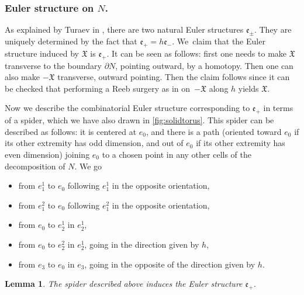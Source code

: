 \documentclass[10pt]{amsart}
\theoremstyle{plain}
\newtheorem{lem}[thm]{Lemma}
\theoremstyle{definition}
\theoremstyle{remark}
\numberwithin{equation}{section}
\begin{document}
\subsubsection*{Euler structure on $N$.}
As explained by Turaev in \cite[\S VI.2.4]{Turaev_tors}, there are two natural Euler structures $\mathfrak e_{\pm}$. They are uniquely determined by the fact that $\mathfrak e_+ = h \mathfrak e_-$. We~claim that the Euler structure induced by $\mathfrak X$ is $\mathfrak e_+$. It can be seen as follows: first one needs to make $\mathfrak X$ transverse to the boundary $\partial N$, pointing outward, by a homotopy. Then one can also make $-\mathfrak X$ transverse, outward pointing. Then the claim follows since it can be checked that performing a Reeb surgery as in \cite[\S I.4.2]{Turaev_tors} on~$- \mathfrak X$ along $h$ yields $\mathfrak X$.

Now we describe the combinatorial Euler structure corresponding to $\mathfrak e_+$ in terms of a spider, which we have also drawn in \cref{fig:solidtorus}. This spider can be described as follows: it is centered at $e_0$, and there is a path (oriented toward $e_0$ if its other extremity has odd dimension, and out of $e_0$ if its other extremity has even dimension) joining $e_0$ to a chosen point in any other cells of the decomposition of $N$. We go
\begin{itemize}
\item from $e_1^1$ to $e_0$ following $e_1^1$ in the opposite orientation,
\item from $e_1^2$ to $e_0$ following $e_1^2$ in the opposite orientation,
\item from $e_0$ to $e_2^1$ in $e_2^1$,
\item from $e_0$ to $e_2^2$ in $e_2^1$, going in the direction given by $h$,
\item from $e_3$ to $e_0$ in $e_3$, going in the opposite of the direction given by $h$.
\end{itemize}

\begin{lem}
\label{lem:spid}
The spider described above induces the Euler structure $\mathfrak e_+$.
\end{lem}
\end{document}
